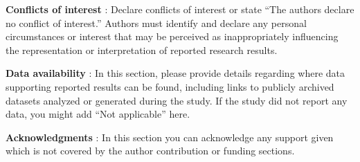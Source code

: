 \documentclass[10pt,twoside,reqno]{amsart} %
\theoremstyle{plain}
\theoremstyle{definition}
\begin{document}



\bigskip
{\bf Conflicts of interest} : {Declare conflicts of interest or state ``The authors declare no conflict of interest.'' Authors must identify and declare any personal circumstances or interest that may be perceived as inappropriately influencing the representation or interpretation of reported research results.} 

\bigskip
{\bf Data availability} : {In this section, please provide details regarding where data supporting reported results can be found, including links to publicly archived datasets analyzed or generated during the study. If the study did not report any data, you might add ``Not applicable'' here.} 

\bigskip
{\bf Acknowledgments} : {In this section you can acknowledge any support given which is not covered by the author contribution or funding sections.}
\end{document}
